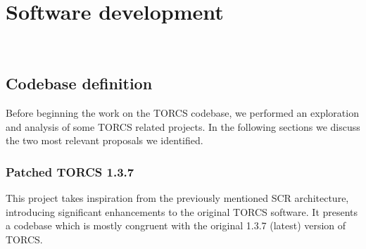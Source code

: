 \chapter{Software development}
\label{cap:development}

\\

\section{Codebase definition}
Before beginning the work on the TORCS codebase, we performed an exploration and analysis of some TORCS related projects. In the following sections we discuss the two most relevant proposals we identified.

\subsection{Patched TORCS 1.3.7}\label{patched-torcs}
This project takes inspiration from the previously mentioned SCR architecture, introducing significant enhancements to the original TORCS software. It presents a codebase which is mostly congruent with the original 1.3.7 (latest) version of TORCS. 
